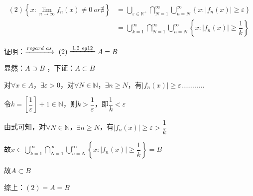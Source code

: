 \begin{eg}
    \begin{align*}
        (2)\left\{x : \lim \limits_{n \to \infty} f_{n}(x) \neq 0 \ or \nexists \right\} & = \bigcup \limits_{\varepsilon \in \mathbb{R}^{+}} \bigcap \limits_{N=1}^{\infty} \bigcup \limits_{n=N}^{\infty} \left\{x : \left\lvert f_{n}(x)\right\rvert \geqslant \varepsilon \right\} \\
        & = \bigcup \limits_{k=1}^{\infty} \bigcap \limits_{N=1}^{\infty} \bigcup \limits_{n=N}^{\infty}\left\{x : \left\lvert f_{n}(x)\right\rvert \geqslant \dfrac{1}{k} \right\}
    \end{align*}
\end{eg}
\noindent 证明：$\xrightarrow{regard \ as} \ (2) \xlongequal{1.2 \ eg12} A = B$
\par 显然：$A \supset B$ ，下证：$A \subset B$
\par 对$\forall x \in A$，$\exists \varepsilon >0$，对$\forall N \in \mathbb{N}$，$\exists n \geqslant N$，有$\left\lvert f_{n}(x)\right\rvert \geqslant \varepsilon \dots \dots \dots \dots $ 
\par 令$k = \left[\dfrac{1}{\varepsilon}\right] +1 \in \mathbb{N}$，则$k > \dfrac{1}{\varepsilon }$，即$\dfrac{1}{k} < \varepsilon $
\par 由式可知，对$\forall N \in \mathbb{N}$，$\exists n \geqslant N$，有$\left\lvert f_{n}(x)\right\rvert \geqslant \varepsilon > \dfrac{1}{k}$
\par 故$x \in \bigcup \limits_{k=1}^{\infty} \bigcap \limits_{N=1}^{\infty} \bigcup \limits_{n=N}^{\infty}\left\{x : \left\lvert f_{n}(x)\right\rvert \geqslant \dfrac{1}{k} \right\} = B$
\par 故$A \subset B$
\par 综上：$(2) = A = B$